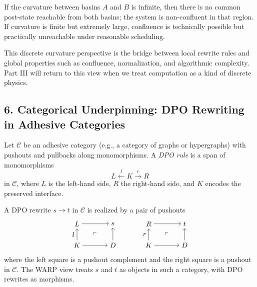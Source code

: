 \begin{proposition}
If the curvature between basins $A$ and $B$ is infinite, then there is no common post-state reachable from both basins; the system is non-confluent in that region. If curvature is finite but extremely large, confluence is technically possible but practically unreachable under reasonable scheduling.
\end{proposition}

\begin{remark}
This discrete curvature perspective is the bridge between local rewrite rules and global properties such as confluence, normalization, and algorithmic complexity. Part III will return to this view when we treat computation as a kind of discrete physics.
\end{remark}

\subsection*{6. Categorical Underpinning: DPO Rewriting in Adhesive Categories}

\begin{definition}
Let $\mathcal{C}$ be an adhesive category (e.g., a category of graphs or hypergraphs) with pushouts and pullbacks along monomorphisms. A \emph{DPO rule} is a span of monomorphisms
\[
L \xleftarrow{l} K \xrightarrow{r} R
\]
in $\mathcal{C}$, where $L$ is the left-hand side, $R$ the right-hand side, and $K$ encodes the preserved interface.
\end{definition}

\begin{definition}
A DPO rewrite $s \to t$ in $\mathcal{C}$ is realized by a pair of pushouts
\[
\begin{tikzpicture}[scale=0.9, baseline=(current bounding box.center)]
    \node (L) at (0,1.2) {$L$};
    \node (K) at (0,0) {$K$};
    \node (G) at (2,1.2) {$s$};
    \node (D) at (2,0) {$D$};
    \draw[->] (K) -- node[left] {$l$} (L);
    \draw[->] (K) -- (D);
    \draw[->] (L) -- (G);
    \draw[->] (D) -- (G);
    \node at (1,0.6) {$\ulcorner$};

    \node (R) at (4,1.2) {$R$};
    \node (K2) at (4,0) {$K$};
    \node (H) at (6,1.2) {$t$};
    \node (D2) at (6,0) {$D$};
    \draw[->] (K2) -- node[left] {$r$} (R);
    \draw[->] (K2) -- (D2);
    \draw[->] (R) -- (H);
    \draw[->] (D2) -- (H);
    \node at (5,0.6) {$\ulcorner$};
\end{tikzpicture}
\]
where the left square is a pushout complement and the right square is a pushout in $\mathcal{C}$. The WARP view treats $s$ and $t$ as objects in such a category, with DPO rewrites as morphisms.
\end{definition}

